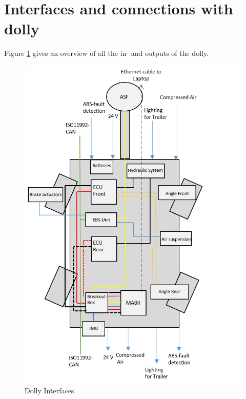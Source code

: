 \documentclass[ExampleMasters.tex]{subfiles}
\begin{document}
\section{Interfaces and connections with dolly}
\label{sec:interface_with_dolly}
Figure \ref{fig:dolly_interfaces} gives an overview of all the in- and outputs of the dolly.\\

\begin{figure}[!htb]

	\includegraphics[width=1.3\linewidth]{figures/ExampleCover}
	\caption{Dolly Interfaces}
	\label{fig:dolly_interfaces}
\end{figure}
\end{document}
